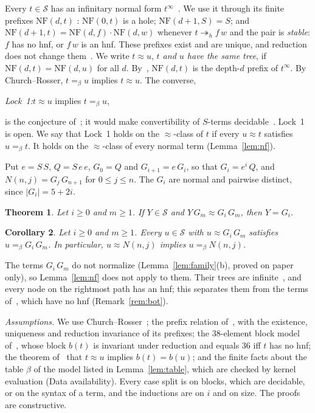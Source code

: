 \documentclass[11pt]{amsart}
\newtheorem{theorem}{Theorem}
\newtheorem{corollary}[theorem]{Corollary}
\theoremstyle{definition}
\newcommand{\Ter}{\mathcal S}
\newcommand{\hred}{\twoheadrightarrow_h}
\newcommand{\conv}{=_\beta}
\newcommand{\sz}[1]{\lvert#1\rvert}
\newcommand{\NF}{\mathrm{NF}}
\begin{document}
Every $t\in\Ter$ has an infinitary normal form $t^\infty$~\citep{s3}. We use it through its finite
prefixes $\NF(d,t)$ \citep[Remark~8]{s3}: $\NF(0,t)$ is a hole; $\NF(d+1,S)=S$; and
$\NF(d+1,t)=\NF(d,f)\cdot\NF(d,w)$ whenever $t\hred f\,w$ and the pair is \emph{stable}: $f$ has no
hnf, or $f\,w$ is an hnf. These prefixes exist and are unique, and reduction does not change
them~\citep{s3}. We write $t\approx u$, \emph{$t$ and $u$ have the same tree}, if
$\NF(d,t)=\NF(d,u)$ for all $d$. By~\citep{s3}, $\NF(d,t)$ is the depth-$d$ prefix of $t^\infty$.
By Church--Rosser, $t\conv u$ implies $t\approx u$. The converse,
\begin{center}
\emph{Lock~1:}\enskip $t\approx u$ implies $t\conv u$,
\end{center}
is the conjecture of~\citep[Conjecture~11]{s6}; it would make convertibility of $S$-terms
decidable~\citep{s6}. Lock~1 is open. We say that Lock~1 holds on the $\approx$-class of $t$ if
every $u\approx t$ satisfies $u\conv t$. It holds on the $\approx$-class of every normal term
(Lemma~\ref{lem:nf}).

Put $e=S\,S$, $Q=S\,e\,e$, $G_0=Q$ and $G_{i+1}=e\,G_i$, so that $G_i=e^i\,Q$, and
$N(n,j)=G_j\,G_{n+1}$ for $0\le j\le n$. The $G_i$ are normal and pairwise distinct, since
$\sz{G_i}=5+2i$.

\begin{theorem}\label{thm:main}
Let $i\ge0$ and $m\ge1$. If $Y\in\Ter$ and $Y\,G_m\approx G_i\,G_m$, then $Y=G_i$.
\end{theorem}

\begin{corollary}\label{cor:lock}
Let $i\ge0$ and $m\ge1$. Every $u\in\Ter$ with $u\approx G_i\,G_m$ satisfies $u\conv G_i\,G_m$. In
particular, $u\approx N(n,j)$ implies $u\conv N(n,j)$.
\end{corollary}

The terms $G_i\,G_m$ do not normalize (Lemma~\ref{lem:family}(b), proved on paper only), so
Lemma~\ref{lem:nf} does not apply to them. Their trees are infinite~\citep[Theorem~7]{s3}, and
every node on the rightmost path has an hnf; this separates them from the terms
of~\citep{s11,s12}, which have no hnf (Remark~\ref{rem:bot}).

\emph{Assumptions.} We use Church--Rosser~\citep{terese}; the prefix relation of~\citep{s3}, with
the existence, uniqueness and reduction invariance of its prefixes; the 38-element block model
of~\citep{s1}, whose block $b(t)$ is invariant under reduction and equals $36$ iff $t$ has no hnf;
the theorem of~\citep[Theorem~F]{s13} that $t\approx u$ implies $b(t)=b(u)$; and the finite facts
about the table $\beta$ of the model listed in Lemma~\ref{lem:table}, which are checked by kernel
evaluation (Data availability). Every case split is on blocks, which are decidable, or on the
syntax of a term, and the inductions are on $i$ and on size. The proofs are constructive.
\end{document}
